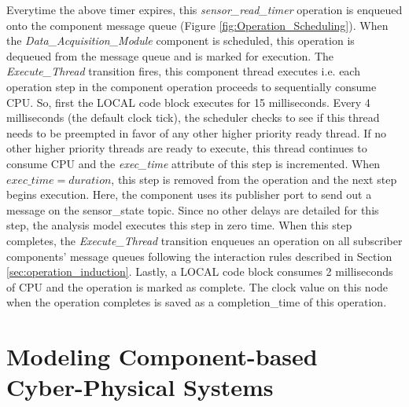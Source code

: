 Everytime the above timer expires, this \emph{sensor\_read\_timer} operation is enqueued onto the component message queue (Figure \ref{fig:Operation_Scheduling}). When the \emph{Data\_Acquisition\_Module} component is scheduled, this operation is dequeued from the message queue and is marked for execution. The \emph{Execute\_Thread} transition fires, this component thread executes i.e. each operation step in the component operation proceeds to sequentially consume CPU. So, first the LOCAL code block executes for 15 milliseconds. Every 4 milliseconds (the default clock tick), the scheduler checks to see if this thread needs to be preempted in favor of any other higher priority ready thread. If no other higher priority threads are ready to execute, this thread continues to consume CPU and the \emph{exec\_time} attribute of this step is incremented. When $exec\_time = duration$, this step is removed from the operation and the next step begins execution. Here, the component uses its publisher port to send out a message on the sensor\_state topic. Since no other delays are detailed for this step, the analysis model executes this step in zero time. When this step completes, the \emph{Execute\_Thread} transition enqueues an operation on all subscriber components' message queues following the interaction rules described in Section \ref{sec:operation_induction}. Lastly, a LOCAL code block consumes 2 milliseconds of CPU and the operation is marked as complete. The clock value on this node when the operation completes is saved as a completion\_time of this operation.  


\section{Modeling Component-based Cyber-Physical Systems}

